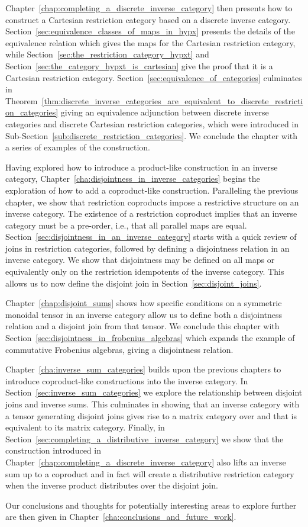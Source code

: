 Chapter~\ref{chap:completing_a_discrete_inverse_category} then presents how to construct a Cartesian
restriction category based on a discrete inverse category.
Section~\ref{sec:equivalence_classes_of_maps_in_hypx} presents the details of the equivalence
relation which gives the maps for the Cartesian restriction category, while
Section~\ref{sec:the_restriction_category_hypxt} and
Section~\ref{sec:the_category_hypxt_is_cartesian} give the proof that it is a Cartesian restriction
category. Section~\ref{sec:equivalence_of_categories} culminates in
Theorem~\ref{thm:discrete_inverse_categories_are_equivalent_to_discrete_restriction_categories}
giving an equivalence adjunction between discrete inverse categories and discrete Cartesian
restriction categories, which were introduced in
Sub-Section~\ref{sub:discrete_restriction_categories}. We conclude the chapter with a series of
examples of the construction.

Having explored how to introduce a product-like construction in an inverse category,
Chapter~\ref{cha:disjointness_in_inverse_categories} begins the exploration of how to add a
coproduct-like construction. Paralleling the previous chapter, we show that restriction coproducts
impose a restrictive structure on an inverse category. The existence of a restriction
coproduct implies that an inverse category must be a pre-order, i.e., that all parallel maps are
equal. Section~\ref{sec:disjointness_in_an_inverse_category} starts with a quick review of joins in
restriction categories, followed by defining a disjointness relation in an inverse category. We show
that disjointness may be defined on all maps or equivalently only on the restriction idempotents of
the inverse category. This allows us to now define the disjoint join in
Section~\ref{sec:disjoint_joins}.

Chapter~\ref{chap:disjoint_sums} shows how specific conditions on a symmetric monoidal
tensor in an inverse category allow us to define both a disjointness relation and a disjoint join
from that tensor. We conclude this chapter with Section~\ref{sec:disjointness_in_frobenius_algebras}
which expands the example of commutative Frobenius algebras, giving a disjointness relation.

Chapter~\ref{cha:inverse_sum_categories} builds upon the previous chapters to introduce
coproduct-like constructions into the inverse
category.  In
Section~\ref{sec:inverse_sum_categories} we explore the relationship between disjoint joins and
inverse sums. This culminates in showing that an inverse category \X with a tensor generating disjoint
joins gives rise to a matrix category over \X and that \X is equivalent to its matrix
category. Finally, in Section~\ref{sec:completing_a_distributive_inverse_category} we show that the
construction introduced in Chapter~\ref{chap:completing_a_discrete_inverse_category} also lifts an
inverse sum up to a coproduct and in fact will create a distributive restriction category when the
inverse product distributes over the disjoint join.

Our conclusions and thoughts for potentially interesting areas to explore further are then given in
Chapter~\ref{cha:conclusions_and_future_work}.



